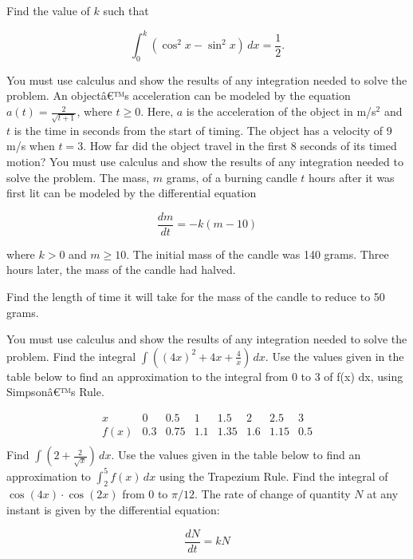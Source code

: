\documentclass[12pt,addpoints]{exam}
\begin{document}
\begin{questions}
Find the value of \( k \) such that

\[
\int_{0}^{k} (\cos^2 x - \sin^2 x) \, dx = \frac{1}{2}.
\]

You must use calculus and show the results of any integration needed to solve the problem.
\fillwithlines{5cm}
\question[5] An objectâ€™s acceleration can be modeled by the equation \( a(t) = \frac{2}{\sqrt{t+1}} \), where \( t \geq 0 \). Here, \( a \) is the acceleration of the object in m/s\(^2\) and \( t \) is the time in seconds from the start of timing. The object has a velocity of 9 m/s when \( t = 3 \). How far did the object travel in the first 8 seconds of its timed motion? You must use calculus and show the results of any integration needed to solve the problem.
\fillwithlines{5cm}
\question[5] The mass, \( m \) grams, of a burning candle \( t \) hours after it was first lit can be modeled by the differential equation

\[ \frac{dm}{dt} = -k(m - 10) \]

where \( k > 0 \) and \( m \geq 10 \). The initial mass of the candle was 140 grams. Three hours later, the mass of the candle had halved.

Find the length of time it will take for the mass of the candle to reduce to 50 grams.

You must use calculus and show the results of any integration needed to solve the problem.
\fillwithlines{5cm}
\question[5] Find the integral \(\int \left( (4x)^2 + 4x + \frac{4}{x} \right) \, dx\).
\fillwithlines{5cm}
\question[5] Use the values given in the table below to find an approximation to the integral from 0 to 3 of f(x) dx, using Simpsonâ€™s Rule.

\[
\begin{array}{c|ccccccc}
x & 0 & 0.5 & 1 & 1.5 & 2 & 2.5 & 3 \\
\hline
f(x) & 0.3 & 0.75 & 1.1 & 1.35 & 1.6 & 1.15 & 0.5 \\
\end{array}
\]
\fillwithlines{5cm}
\question[5] Find \(\int \left( 2 + \frac{2}{\sqrt{x}} \right) \, dx\).
\fillwithlines{5cm}
\question[5] Use the values given in the table below to find an approximation to \(\int_{2}^{5} f(x) \, dx\) using the Trapezium Rule.
\fillwithlines{5cm}
\question[5] Find the integral of \(\cos(4x) \cdot \cos(2x)\) from 0 to \(\pi/12\).
\fillwithlines{5cm}
\question[5] The rate of change of quantity \( N \) at any instant is given by the differential equation:

\[
\frac{dN}{dt} = kN
\]


\end{questions}
\end{document}
